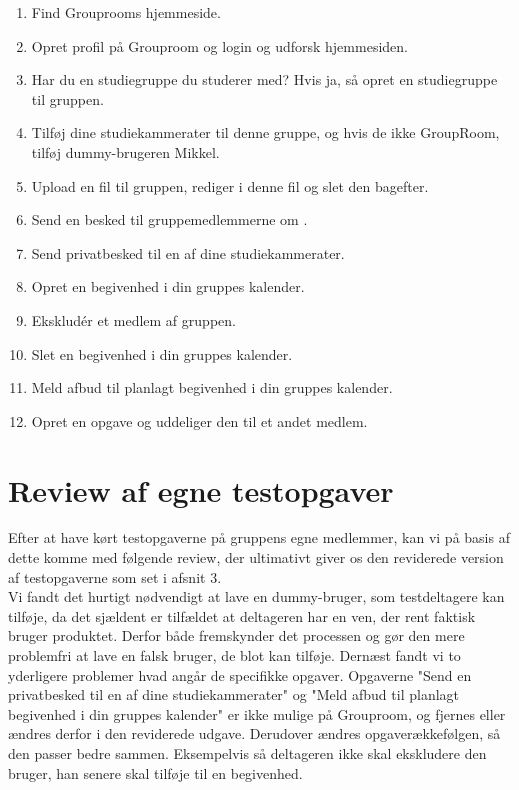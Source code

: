 \documentclass[12pt]{article}
\begin{document}
\begin{enumerate}
\item Find Grouprooms hjemmeside.
\item Opret profil på Grouproom og login og udforsk hjemmesiden.
\item Har du en studiegruppe du studerer med? Hvis ja, så opret en studiegruppe til gruppen.
\item Tilføj dine studiekammerater til denne gruppe, og hvis de ikke GroupRoom, tilføj dummy-brugeren Mikkel.
\item Upload en fil til gruppen, rediger i denne fil og slet den bagefter.
\item Send en besked til gruppemedlemmerne om .
\item Send privatbesked til en af dine studiekammerater.
\item Opret en begivenhed i din gruppes kalender.
\item Ekskludér et medlem af gruppen.
\item Slet en begivenhed i din gruppes kalender.
\item Meld afbud til planlagt begivenhed i din gruppes kalender.
\item Opret en opgave og uddeliger den til et andet medlem.
\end{enumerate}

\newpage

\section{Review af egne testopgaver}

Efter at have kørt testopgaverne på gruppens egne medlemmer, kan vi på basis af dette komme med følgende review, der ultimativt giver os den reviderede version af testopgaverne som set i afsnit 3.\\

\noindent Vi fandt det hurtigt nødvendigt at lave en dummy-bruger, som testdeltagere kan tilføje, da det sjældent er tilfældet at deltageren har en ven, der rent faktisk bruger produktet. Derfor både fremskynder det processen og gør den mere problemfri at lave en falsk bruger, de blot kan tilføje. Dernæst fandt vi to yderligere problemer hvad angår de specifikke opgaver. Opgaverne "Send en privatbesked til en af dine studiekammerater" og "Meld afbud til planlagt begivenhed i din gruppes kalender" er ikke mulige på Grouproom, og fjernes eller ændres derfor i den reviderede udgave. Derudover ændres opgaverækkefølgen, så den passer bedre sammen. Eksempelvis så deltageren ikke skal ekskludere den bruger, han senere skal tilføje til en begivenhed.\\
\end{document}
